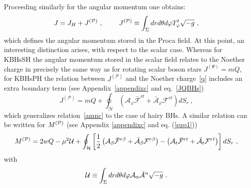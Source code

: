 %
Proceeding similarly for the angular momentum one obtains:
\begin{equation}
J=J_H+J^{(\mathcal{P})} \ , \ \qquad  J^{({\cal P})}\equiv  \int_{\Sigma} dr d\theta d\varphi T^t_\varphi \sqrt{-g} \ ,
\label{amd}
\end{equation}
which defines the angular momentum stored in the Proca field. At this point, an interesting distinction arises, with respect to the scalar case. 
 Whereas for KBHsSH the angular momentum stored in the scalar field relates to the Noether charge in precisely the same way as for rotating scalar boson stars $J^{(\Psi)}=mQ$, for KBHsPH the relation between $J^{(\mathcal{P})} $ and  the Noether charge~\eqref{q} includes an extra boundary term (see Appendix~\ref{appendixc} and eq.~\eqref{JQBHs})
\begin{equation}
\label{nr1}
J^{(\mathcal{P})}=mQ+ \oint_\mathcal{H}  ({\mathcal{A}}_\varphi \bar{ {\mathcal{F}}}^{r t}+\bar{\mathcal{A}}_\varphi { {\mathcal{F}}}^{r t}  ) dS_r \ ,
\end{equation}
which generalizes relation~\eqref{amnc} to the case of hairy BHs. 
A similar relation can be written for $M^{({\cal P})}$ (see Appendix \ref{appendixc}
and eq. (\ref{sup1}))
\begin{equation}
\label{nr2}
M^{({\cal P})}=2w Q
-\mu^2  {\cal U}
+ \oint_\mathcal{H}  
\left[
\frac{1}{2} 
\left(
{\mathcal{A}}_\beta \bar{ {\mathcal{F}}}^{r \beta}+\bar{\mathcal{A}}_\beta { {\mathcal{F}}}^{r \beta}
\right)
-\left({\mathcal{A}}_t \bar{ {\mathcal{F}}}^{r t}+\bar{\mathcal{A}}_t { {\mathcal{F}}}^{r t}
\right)  
\right] dS_r \ ,
\end{equation}
with
\begin{equation}
\label{U}
{\cal U}\equiv \int _\Sigma  dr d\theta d\varphi  {\mathcal{A}}_\alpha \bar {\mathcal{A}}^\alpha \sqrt{-g}\ .
\end{equation}


